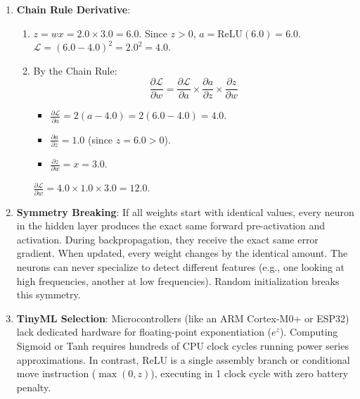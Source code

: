 \begin{enumerate}
    \item \textbf{Chain Rule Derivative}:
    \begin{enumerate}
        \item $z = w x = 2.0 \times 3.0 = 6.0$.
        Since $z > 0$, $a = \text{ReLU}(6.0) = 6.0$.
        $\mathcal{L} = (6.0 - 4.0)^2 = 2.0^2 = \mathbf{4.0}$.
        \item By the Chain Rule:
        \begin{equation*}
        \frac{\partial \mathcal{L}}{\partial w} = \frac{\partial \mathcal{L}}{\partial a} \times \frac{\partial a}{\partial z} \times \frac{\partial z}{\partial w}
        \end{equation*}
        \begin{itemize}
            \item $\frac{\partial \mathcal{L}}{\partial a} = 2(a - 4.0) = 2(6.0 - 4.0) = 4.0$.
            \item $\frac{\partial a}{\partial z} = 1.0$ (since $z = 6.0 > 0$).
            \item $\frac{\partial z}{\partial w} = x = 3.0$.
        \end{itemize}
        $\frac{\partial \mathcal{L}}{\partial w} = 4.0 \times 1.0 \times 3.0 = \mathbf{12.0}$.
    \end{enumerate}

    \item \textbf{Symmetry Breaking}:
    If all weights start with identical values, every neuron in the hidden layer produces the exact same forward pre-activation and activation. During backpropagation, they receive the exact same error gradient. When updated, every weight changes by the identical amount. The neurons can never specialize to detect different features (e.g., one looking at high frequencies, another at low frequencies). Random initialization breaks this symmetry.

    \item \textbf{TinyML Selection}:
    Microcontrollers (like an ARM Cortex-M0+ or ESP32) lack dedicated hardware for floating-point exponentiation ($e^z$). Computing Sigmoid or Tanh requires hundreds of CPU clock cycles running power series approximations. In contrast, ReLU is a single assembly branch or conditional move instruction ($\max(0, z)$), executing in 1 clock cycle with zero battery penalty.
\end{enumerate}
